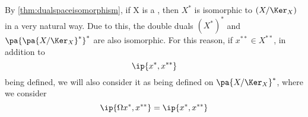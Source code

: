 \begin{rmk}
\label{rmk:doubledualnotation}
    By \ref{thm:dualspaceisomorphism}, 
    if X is a \SeminormedSpace, 
    then $X^*$ is isomorphic to 
    $(X/\Ker_X)$ in a very natural way.
    Due to this, the double duals
    $(X^*)^*$ and $\pa{\pa{X/\Ker_X}^*}^*$ 
    are also isomorphic. 
    For this reason, if $x^{**} \in X^{**}$, 
    in addition to 
    \begin{equation}
    \ip{x^*, x^{**}}
    \end{equation}
    being defined, we will also consider it
    as being defined on 
    $\pa{X/\Ker_X}^{*}$, where we consider
    \begin{equation}
    \ip{\Omega x^*, x^{**}} = \ip{x^*, x^{**}}
    \end{equation}


\end{rmk}

